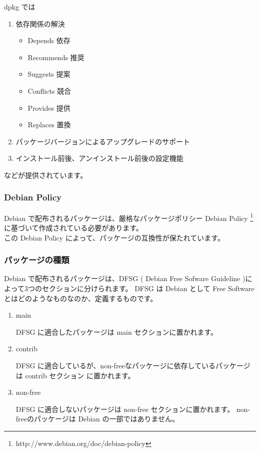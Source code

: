 \documentclass[mingoth,a4paper]{jsarticle}
\begin{document}
	dpkg では
	\begin{enumerate}
		\item 依存関係の解決

			\begin{itemize}
				\item Depends                 依存
				\item Recommends              推奨
				\item Suggests                提案
				\item Conflicts               競合
				\item Provides                提供
				\item Replaces                置換
			\end{itemize}

		\item パッケージバージョンによるアップグレードのサポート

		\item インストール前後、アンインストール前後の設定機能
	\end{enumerate}
	などが提供されています。

\subsubsection{Debian Policy}

	Debian で配布されるパッケージは、厳格なパッケージポリシー Debian Policy 
	\footnote{http://www.debian.org/doc/debian-policy} に基づいて作成されている必要があります。\\
	この Debian Policy によって、パッケージの互換性が保たれています。

\subsubsection{パッケージの種類}
	Debian で配布されるパッケージは、DFSG ( Debian Free Sofware Guideline )によって3つのセクションに分けられます。
	DFSG は Debian として Free Software とはどのようなものなのか、定義するものです。

	\begin{enumerate}
		\item main

			DFSG に適合したパッケージは main セクションに置かれます。
		\item contrib

			DFSG に適合しているが、non-freeなパッケージに依存しているパッケージは contrib セクション
			に置かれます。
		\item non-free

			DFSG に適合しないパッケージは non-free セクションに置かれます。
			non-freeのパッケージは Debian の一部ではありません。
	\end{enumerate}
\end{document}
